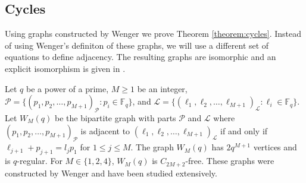 \documentclass[12pt]{article}%
\begin{document}
\bigskip



\subsection{Cycles}\label{cycle subsection}

Using graphs constructed by Wenger we prove Theorem \ref{theorem:cycles}.  Instead of using Wenger's definiton of these graphs, we will use a different set of equations to define adjacency.  The resulting graphs are isomorphic and an explicit isomorphism is given in \cite{Cioaba2014}.
      
Let $q$ be a power of a prime, $M \geq 1$ be an integer, 
$\mathcal{P} = \{ ( p_1, p_2, \dots , p_{M+1} )_{ \mathcal{P}} : p_i \in \mathbb{F}_q \}$, and 
$ \mathcal{L} = \{ ( \ell_1 , \ell_2 , \dots , \ell_{M+1} )_{ \mathcal{L}} : \ell_i \in \mathbb{F}_q \}$.  
Let $W_M(q)$ be the bipartite graph with parts $\mathcal{P}$ and $\mathcal{L}$ where 
$( p_1, p_2, \dots , p_{M+1} )_{ \mathcal{P}} $ 
is adjacent to $( \ell_1 , \ell_2 , \dots , \ell_{M+1} )_{ \mathcal{L}}$ if and only if $\ell_{j+1} + p_{j+1} = l_j p_1 $ for $1 \leq j \leq M$.  The graph 
$W_M (q)$ has $2q^{M+1}$ vertices and is $q$-regular.  For $M \in \{1,2,4 \}$, $W_M(q)$ is $C_{2M+2}$-free.
These graphs were constructed by Wenger \cite{Wenger} and have been studied extensively.  

\bigskip
\end{document}
